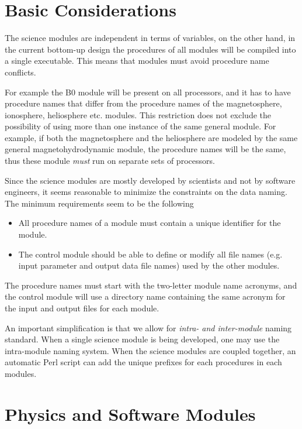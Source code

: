 \section{Basic Considerations}

The science modules are independent in terms of variables, on the
other hand, in the current bottom-up design the procedures
of all modules will be compiled into a single executable. 
This means that modules must avoid procedure name conflicts. 

For example the B0 module will be present on all processors, and it
has to have procedure names that differ from the procedure names
of the magnetosphere, ionosphere, heliosphere etc. modules.
This restriction does not exclude the possibility of using
more than one instance of the same general module. 
For example, if both the magnetosphere and the heliosphere 
are modeled by the same general magnetohydrodynamic module, 
the procedure names will be the same, thus these module {\it must} 
run on separate sets of processors.

Since the science modules are mostly developed by scientists and not
by software engineers, it seems reasonable to minimize the constraints
on the data naming. The minimum requirements seem to be the following
\begin{itemize}
\item All procedure names of a module must contain a unique identifier
      for the module.
\item The control module should be able to define or modify all file names 
      (e.g. input parameter and output data file names) used by the other
      modules. 
\end{itemize}
The procedure names must start with the two-letter module name
acronyms, and the control module will use a directory name containing
the same acronym for the input and output files for each module.

An important simplification is that we allow for 
{\it intra- and inter-module} naming standard. 
When a single science module is being developed,
one may use the intra-module naming system. When the science modules
are coupled together, an automatic Perl script can add the unique
prefixes for each procedures in each modules.

\section{Physics and Software Modules}

